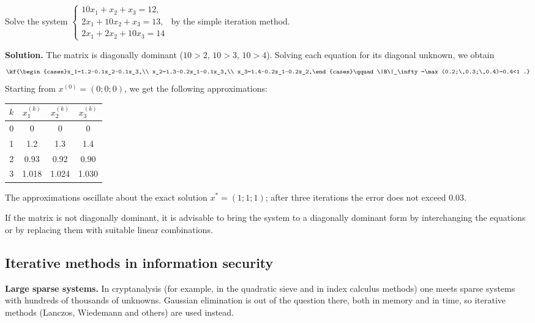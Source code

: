 \begin{misol}
Solve the system
$\begin{cases}10x_1+x_2+x_3=12,\\2x_1+10x_2+x_3=13,\\2x_1+2x_2+10x_3=14\end{cases}$
by the simple iteration method.

\textbf{Solution.} The matrix is diagonally dominant ($10>2$, $10>3$, $10>4$).
Solving each equation for its diagonal unknown, we obtain
\[\kf{\begin{cases}x_1=1.2-0.1x_2-0.1x_3,\\
x_2=1.3-0.2x_1-0.1x_3,\\
x_3=1.4-0.2x_1-0.2x_2,\end{cases}\qquad
\|B\|_\infty=\max(0.2;\,0.3;\,0.4)=0.4<1 .}\]
Starting from $x^{(0)}=(0;0;0)$, we get the following approximations:

\begin{center}
\begin{tabular}{c|ccc}
$k$ & $x_1^{(k)}$ & $x_2^{(k)}$ & $x_3^{(k)}$\\ \hline
0 & 0 & 0 & 0\\
1 & 1.2 & 1.3 & 1.4\\
2 & 0.93 & 0.92 & 0.90\\
3 & 1.018 & 1.024 & 1.030\\
\end{tabular}
\end{center}
The approximations oscillate about the exact solution $x^*=(1;1;1)$; after
three iterations the error does not exceed $0.03$.
\end{misol}

\begin{eslatma}
If the matrix is not diagonally dominant, it is advisable to bring the system
to a diagonally dominant form by interchanging the equations or by replacing
them with suitable linear combinations.
\end{eslatma}

\subsection{Iterative methods in information security}

\textbf{Large sparse systems.} In cryptanalysis (for example, in the quadratic
sieve and in index calculus methods) one meets sparse systems with hundreds of
thousands of unknowns. Gaussian elimination is out of the question there, both
in memory and in time, so iterative methods (Lanczos, Wiedemann and others)
are used instead.

